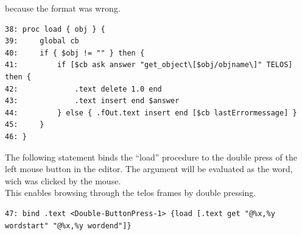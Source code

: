 	 because the format was wrong.
\begin{verbatim}
38: proc load { obj } {
39:     global cb
40:     if { $obj != "" } then {
41:         if [$cb ask answer "get_object\[$obj/objname\]" TELOS] then { 
42: 	        .text delete 1.0 end
43: 	        .text insert end $answer
44: 	    } else { .fOut.text insert end [$cb lastErrormessage] }
45:     }
46: }
\end{verbatim}
	The following statement binds the ``load'' procedure 
	 to the double press of the left mouse button in the editor.
	The argument will be evaluated as the word,
	  wich was clicked by the mouse. \\
	This enables browsing through the telos frames by double pressing.
\begin{verbatim}
47: bind .text <Double-ButtonPress-1> {load [.text get "@%x,%y wordstart" "@%x,%y wordend"]}
\end{verbatim}
